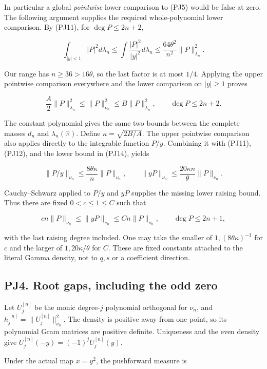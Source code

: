 \documentclass[10pt]{article}
\begin{document}
In particular a global \emph{pointwise} lower comparison to (PJ5) would be false at zero. The following argument supplies the required whole-polynomial lower comparison. By (PJ11), for \(\deg P\le2n+2\),

\[
\int_{|y|<1}|P|^2d\lambda_n
\le\int\frac{|P|^2}{|y|^2}d\lambda_n
\le\frac{64\theta^2}{n^2}\|P\|_{\lambda_n}^2.
\]

Our range has \(n\ge36>16\theta\), so the last factor is at most \(1/4\). Applying the upper pointwise comparison everywhere and the lower comparison on \(|y|\ge1\) proves

\[
\frac A2\|P\|_{\lambda_n}^2
\le\|P\|_{\nu_n}^2\le B\|P\|_{\lambda_n}^2,
\qquad\deg P\le2n+2.
\tag{PJ14}
\]

The constant polynomial gives the same two bounds between the complete masses \(d_n\) and \(\lambda_n(\mathbb R)\). Define \(\kappa=\sqrt{2B/A}\). The upper pointwise comparison also applies directly to the integrable function \(P/y\). Combining it with (PJ11), (PJ12), and the lower bound in (PJ14), yields

\[
\|P/y\|_{\nu_n}\le\frac{8\theta\kappa}{n}\|P\|_{\nu_n},
\qquad
\|yP\|_{\nu_n}\le\frac{20\kappa n}{\theta}\|P\|_{\nu_n}.
\tag{PJ15}
\]

Cauchy--Schwarz applied to \(P/y\) and \(yP\) supplies the missing lower raising bound. Thus there are fixed \(0<c\le1\le C\) such that

\[
cn\|P\|_{\nu_n}\le\|yP\|_{\nu_n}\le Cn\|P\|_{\nu_n},
\qquad\deg P\le2n+1,
\tag{PJ16}
\]

with the last raising degree included. One may take the smaller of \(1,(8\theta\kappa)^{-1}\) for \(c\) and the larger of \(1,20\kappa/\theta\) for \(C\). These are fixed constants attached to the literal Gamma density, not to \(q,s\) or a coefficient direction.

\subsection{PJ4. Root gaps, including the odd zero}\label{pj4.-root-gaps-including-the-odd-zero}

Let \(U_j^{[n]}\) be the monic degree-\(j\) polynomial orthogonal for \(\nu_n\), and \(h_j^{[n]}=\|U_j^{[n]}\|_{\nu_n}^2\). The density is positive away from one point, so its polynomial Gram matrices are positive definite. Uniqueness and the even density give \(U_j^{[n]}(-y)=(-1)^jU_j^{[n]}(y)\).

Under the actual map \(x=y^2\), the pushforward measure is
\end{document}
